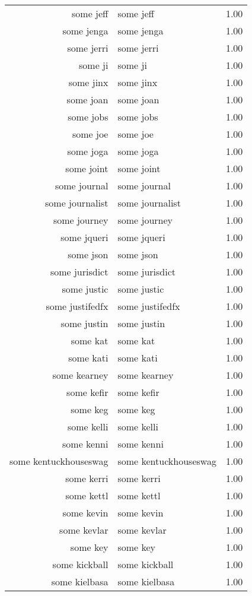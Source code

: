 \begin{table}[ht]
\begin{tabular}{rlr}
  some jeff & some jeff & 1.00 \\ 
  some jenga & some jenga & 1.00 \\ 
  some jerri & some jerri & 1.00 \\ 
  some ji & some ji & 1.00 \\ 
  some jinx & some jinx & 1.00 \\ 
  some joan & some joan & 1.00 \\ 
  some jobs & some jobs & 1.00 \\ 
  some joe & some joe & 1.00 \\ 
  some joga & some joga & 1.00 \\ 
  some joint & some joint & 1.00 \\ 
  some journal & some journal & 1.00 \\ 
  some journalist & some journalist & 1.00 \\ 
  some journey & some journey & 1.00 \\ 
  some jqueri & some jqueri & 1.00 \\ 
  some json & some json & 1.00 \\ 
  some jurisdict & some jurisdict & 1.00 \\ 
  some justic & some justic & 1.00 \\ 
  some justifedfx & some justifedfx & 1.00 \\ 
  some justin & some justin & 1.00 \\ 
  some kat & some kat & 1.00 \\ 
  some kati & some kati & 1.00 \\ 
  some kearney & some kearney & 1.00 \\ 
  some kefir & some kefir & 1.00 \\ 
  some keg & some keg & 1.00 \\ 
  some kelli & some kelli & 1.00 \\ 
  some kenni & some kenni & 1.00 \\ 
  some kentuckhouseswag & some kentuckhouseswag & 1.00 \\ 
  some kerri & some kerri & 1.00 \\ 
  some kettl & some kettl & 1.00 \\ 
  some kevin & some kevin & 1.00 \\ 
  some kevlar & some kevlar & 1.00 \\ 
  some key & some key & 1.00 \\ 
  some kickball & some kickball & 1.00 \\ 
  some kielbasa & some kielbasa & 1.00 \\ 

\end{tabular}
\end{table}
